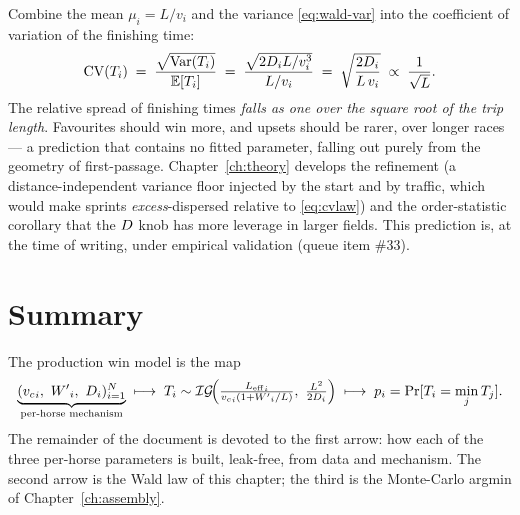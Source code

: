 Combine the mean $\mu_i=L/v_i$ and the variance \eqref{eq:wald-var} into the coefficient of
variation of the finishing time:
\begin{equation}
  \mathrm{CV}(T_i)
   \;=\; \frac{\sqrt{\operatorname{Var}(T_i)}}{\mathbb{E}[T_i]}
   \;=\; \frac{\sqrt{2D_i L/v_i^3}}{L/v_i}
   \;=\; \sqrt{\frac{2D_i}{L\,v_i}}
   \;\propto\; \frac{1}{\sqrt{L}} .
  \label{eq:cvlaw}
\end{equation}
The relative spread of finishing times \emph{falls as one over the square root of the trip
length}. Favourites should win more, and upsets should be rarer, over longer races --- a
prediction that contains no fitted parameter, falling out purely from the geometry of
first-passage. Chapter~\ref{ch:theory} develops the refinement (a distance-independent variance
floor injected by the start and by traffic, which would make sprints \emph{excess}-dispersed
relative to \eqref{eq:cvlaw}) and the order-statistic corollary that the $D$ knob has more
leverage in larger fields. This prediction is, at the time of writing, under empirical validation
(queue item \#33).

\section{Summary}

The production win model is the map
\[
  \underbrace{(\vc_i,\ \Wp_i,\ \Ddiff_i)_{i=1}^N}_{\text{per-horse mechanism}}
   \;\longmapsto\;
  \Tfin_i\sim\IG\!\Big(\tfrac{\Leff_i}{\vc_i(1+\Wp_i/L)},\ \tfrac{L^2}{2\Ddiff_i}\Big)
   \;\longmapsto\;
  p_i = \Pr[\Tfin_i = \min_j \Tfin_j].
\]
The remainder of the document is devoted to the first arrow: how each of the three per-horse
parameters is built, leak-free, from data and mechanism. The second arrow is the Wald law of this
chapter; the third is the Monte-Carlo argmin of Chapter~\ref{ch:assembly}.
